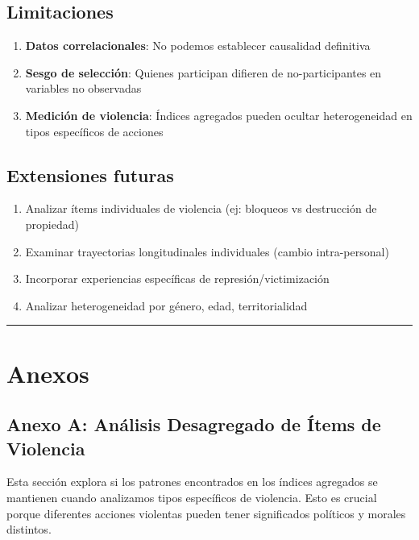 \documentclass[
  12pt,
]{article}
\providecommand{\tightlist}{%
  \setlength{\itemsep}{0pt}\setlength{\parskip}{0pt}}
\begin{document}
\subsection{Limitaciones}\label{limitaciones}

\begin{enumerate}
\def\labelenumi{\arabic{enumi}.}
\tightlist
\item
  \textbf{Datos correlacionales}: No podemos establecer causalidad
  definitiva
\item
  \textbf{Sesgo de selección}: Quienes participan difieren de
  no-participantes en variables no observadas
\item
  \textbf{Medición de violencia}: Índices agregados pueden ocultar
  heterogeneidad en tipos específicos de acciones
\end{enumerate}

\subsection{Extensiones futuras}\label{extensiones-futuras}

\begin{enumerate}
\def\labelenumi{\arabic{enumi}.}
\tightlist
\item
  Analizar ítems individuales de violencia (ej: bloqueos vs destrucción
  de propiedad)
\item
  Examinar trayectorias longitudinales individuales (cambio
  intra-personal)
\item
  Incorporar experiencias específicas de represión/victimización
\item
  Analizar heterogeneidad por género, edad, territorialidad
\end{enumerate}

\begin{center}\rule{0.5\linewidth}{0.5pt}\end{center}

\section{Anexos}\label{anexos}

\subsection{Anexo A: Análisis Desagregado de Ítems de
Violencia}\label{anexo-a-anuxe1lisis-desagregado-de-uxedtems-de-violencia}

Esta sección explora si los patrones encontrados en los índices
agregados se mantienen cuando analizamos tipos específicos de violencia.
Esto es crucial porque diferentes acciones violentas pueden tener
significados políticos y morales distintos.
\end{document}
